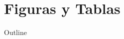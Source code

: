 \documentclass{beamer}
\begin{document}
\section{Figuras y Tablas}

\begin{frame}{Outline}
  \begin{multicols}{2}
    \tableofcontents[currentsection]
  \end{multicols}
\end{frame}

\end{document}

